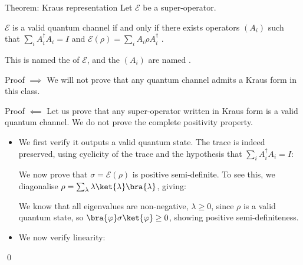 \documentclass[a4paper]{article}
\begin{document}
\begin{parag}{Theorem: Kraus representation}
    Let $\mathcal{E}$ be a super-operator.

    $\mathcal{E}$ is a valid quantum channel if and only if there exists operators $\left(A_i\right)$ such that $\sum_{i} A_i^{\dagger} A_i = I$ and $\mathcal{E}\left(\rho\right) = \sum_{i} A_i \rho A_i^{\dagger}$ .

    This is named the  of $\mathcal{E}$, and the $\left(A_i\right)$ are named .

    \begin{subparag}{Proof $\implies$}
        We will not prove that any quantum channel admits a Kraus form in this class.
    \end{subparag}

    \begin{subparag}{Proof $\impliedby$}
        Let us prove that any super-operator written in Kraus form is a valid quantum channel. We do not prove the complete positivity property.

        \begin{itemize}[left=0pt]
            \item We first verify it outputs a valid quantum state. The trace is indeed preserved, using cyclicity of the trace and the hypothesis that $\sum_{i} A_i^{\dagger} A_i = I$: 

            We now prove that $\sigma = \mathcal{E}\left(\rho\right)$ is positive semi-definite. To see this, we diagonalise $\rho = \sum_{\lambda} \lambda \ket{\lambda}\bra{\lambda}$, giving: 
            
            We know that all eigenvalues are non-negative, $\lambda \geq 0$, since $\rho$ is a valid quantum state, so $\bra{\phi} \sigma \ket{\phi} \geq 0$, showing positive semi-definiteness.
            
            \item We now verify linearity: 
        \end{itemize}

        \qed
    \end{subparag}
\end{parag}
\end{document}

